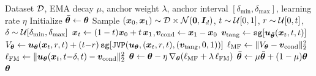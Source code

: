 \begin{algorithm}[t]
    \caption{Training the $\beta\!=\!1$ instantiation with EMA tangent and FM anchor loss}
    \label{alg: va-mf}
    \begin{algorithmic}
        \Require Dataset ${\mathcal{D}}$, EMA decay $\mu$, anchor weight $\lambda$, anchor interval $[\delta_{\min},\delta_{\max}]$, learning rate $\eta$
        \State Initialize $\bar{{\bm{\theta}}}\gets{\bm{\theta}}$
            \State Sample $({\bm{x}}_{0},{\bm{x}}_{1})\sim{\mathcal{D}}\times{\mathcal{N}}(\bm{0},{\bm{I}}_{d})$,\; $t\sim{\mathcal{U}}[0,1]$,\; $r\sim{\mathcal{U}}[0,t]$,\; $\delta\sim{\mathcal{U}}[\delta_{\min},\delta_{\max}]$
            \State ${\bm{x}}_{t}\gets(1-t){\bm{x}}_{0}+t\,{\bm{x}}_{1}$,\quad ${\bm{v}}_{\text{cond}}\gets{\bm{x}}_{1}-{\bm{x}}_{0}$
            \State ${\bm{v}}_{\text{tang}}\gets\texttt{sg}\!\left[{\bm{u}}_{\bar{{\bm{\theta}}}}({\bm{x}}_{t},t,t)\right]$ 
            \State $V_{{\bm{\theta}}}\gets{\bm{u}}_{{\bm{\theta}}}({\bm{x}}_{t},r,t)+(t{-}r)\,\texttt{sg}\!\left[\texttt{JVP}({\bm{u}}_{{\bm{\theta}}},({\bm{x}}_{t},r,t),({\bm{v}}_{\text{tang}},0,1))\right]$
            \State $\ell_{\text{MF}}\gets\|V_{{\bm{\theta}}}-{\bm{v}}_{\text{cond}}\|_{2}^{2}$
            \State $\ell_{\text{FM}}\gets\|{\bm{u}}_{{\bm{\theta}}}({\bm{x}}_{t},t{-}\delta,t)-{\bm{v}}_{\text{cond}}\|_{2}^{2}$ 
            \State ${\bm{\theta}}\gets{\bm{\theta}}-\eta\,\nabla_{{\bm{\theta}}}\!\left(\ell_{\text{MF}}+\lambda\,\ell_{\text{FM}}\right)$
            \State $\bar{{\bm{\theta}}}\gets\mu\bar{{\bm{\theta}}}+(1-\mu){\bm{\theta}}$ 
        \EndFor
        \State \Return ${\bm{\theta}}$ 
    \end{algorithmic}
\end{algorithm}
